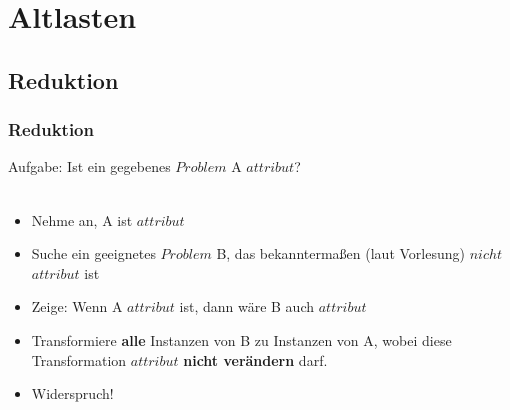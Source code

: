 




\section{Altlasten}
\subsection{Reduktion}

\begin{frame}
\frametitle{Reduktion}
Aufgabe: Ist ein gegebenes $Problem$ A $attribut$?~\\~\\
\begin{itemize}
\item Nehme an, A ist $attribut$
\item Suche ein geeignetes $Problem$ B, das bekanntermaßen (laut Vorlesung) $nicht$ $attribut$ ist
\item Zeige: Wenn A $attribut$ ist, dann wäre B auch $attribut$
\item Transformiere \textbf{alle} Instanzen von B zu Instanzen von A, wobei diese Transformation $attribut$ \textbf{nicht verändern} darf.
\item Widerspruch!
\end{itemize}
\end{frame}

